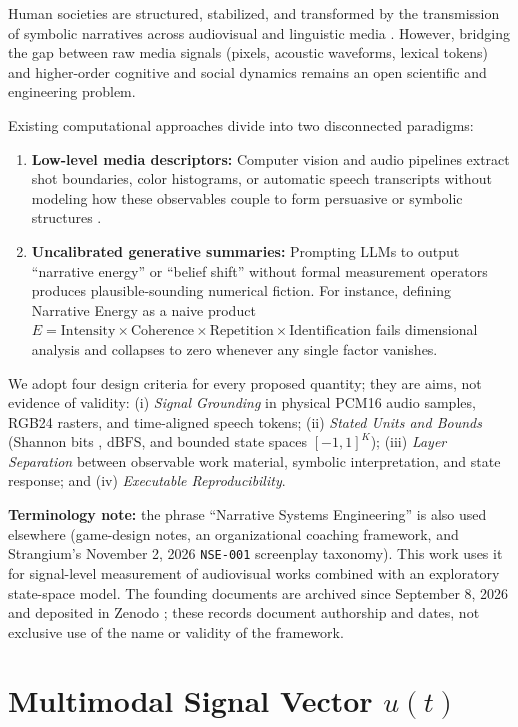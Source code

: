 \documentclass[10pt,letterpaper]{article}
\begin{document}
Human societies are structured, stabilized, and transformed by the transmission of symbolic narratives across audiovisual and linguistic media \cite{Green2000,Jones2010,Shiller2017}. However, bridging the gap between raw media signals (pixels, acoustic waveforms, lexical tokens) and higher-order cognitive and social dynamics remains an open scientific and engineering problem.

Existing computational approaches divide into two disconnected paradigms:
\begin{enumerate}
  \item \textbf{Low-level media descriptors:} Computer vision and audio pipelines extract shot boundaries, color histograms, or automatic speech transcripts without modeling how these observables couple to form persuasive or symbolic structures \cite{Vicol2018}.
  \item \textbf{Uncalibrated generative summaries:} Prompting LLMs to output ``narrative energy'' or ``belief shift'' without formal measurement operators produces plausible-sounding numerical fiction. For instance, defining Narrative Energy as a naive product $E = \mathrm{Intensity} \times \mathrm{Coherence} \times \mathrm{Repetition} \times \mathrm{Identification}$ fails dimensional analysis and collapses to zero whenever any single factor vanishes.
\end{enumerate}

We adopt four design criteria for every proposed quantity; they are aims, not evidence of validity: (i) \emph{Signal Grounding} in physical PCM16 audio samples, RGB24 rasters, and time-aligned speech tokens; (ii) \emph{Stated Units and Bounds} (Shannon bits \cite{Shannon1948,Lin1991}, $\mathrm{dBFS}$, and bounded state spaces $[-1,1]^K$); (iii) \emph{Layer Separation} between observable work material, symbolic interpretation, and state response; and (iv) \emph{Executable Reproducibility}.

\textbf{Terminology note:} the phrase ``Narrative Systems Engineering'' is also used elsewhere (game-design notes, an organizational coaching framework, and Strangium's November 2, 2026 \texttt{NSE-001} screenplay taxonomy). This work uses it for signal-level measurement of audiovisual works combined with an exploratory state-space model. The founding documents are archived since September 8, 2026 and deposited in Zenodo \cite{RojasRuiz2026NSE}; these records document authorship and dates, not exclusive use of the name or validity of the framework.

\section{Multimodal Signal Vector \texorpdfstring{$u(t)$}{u(t)}}
\end{document}
